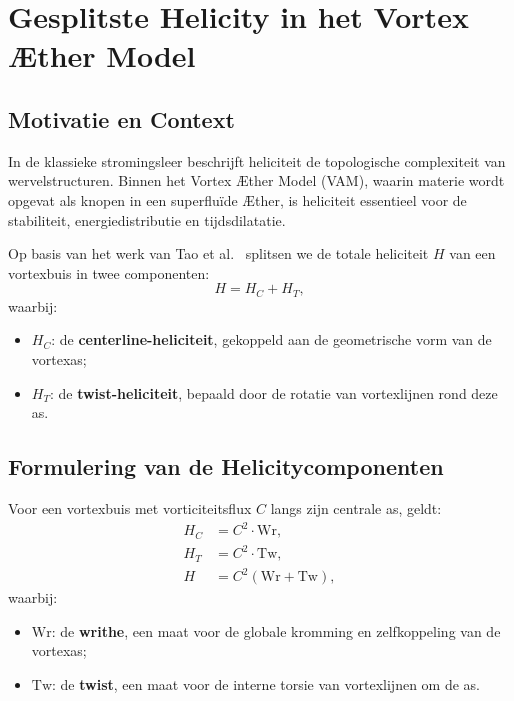 
\section{Gesplitste Helicity in het Vortex Æther Model}

\subsection{Motivatie en Context}

In de klassieke stromingsleer beschrijft heliciteit de topologische complexiteit van wervelstructuren. Binnen het Vortex Æther Model (VAM), waarin materie wordt opgevat als knopen in een superfluïde Æther, is heliciteit essentieel voor de stabiliteit, energiedistributie en tijdsdilatatie.

Op basis van het werk van Tao et al.~\cite{Tao2021} splitsen we de totale heliciteit $H$ van een vortexbuis in twee componenten:
\begin{equation}
    H = H_C + H_T,
\end{equation}
waarbij:
\begin{itemize}
    \item $H_C$: de \textbf{centerline-heliciteit}, gekoppeld aan de geometrische vorm van de vortexas;
    \item $H_T$: de \textbf{twist-heliciteit}, bepaald door de rotatie van vortexlijnen rond deze as.
\end{itemize}

\subsection{Formulering van de Helicitycomponenten}

Voor een vortexbuis met vorticiteitsflux $C$ langs zijn centrale as, geldt:
\begin{align}
    H_C &= C^2 \cdot \text{Wr}, \\
    H_T &= C^2 \cdot \text{Tw}, \\
    H &= C^2 (\text{Wr} + \text{Tw}),
\end{align}
waarbij:
\begin{itemize}
    \item $\text{Wr}$: de \textbf{writhe}, een maat voor de globale kromming en zelfkoppeling van de vortexas;
    \item $\text{Tw}$: de \textbf{twist}, een maat voor de interne torsie van vortexlijnen om de as.
\end{itemize}

